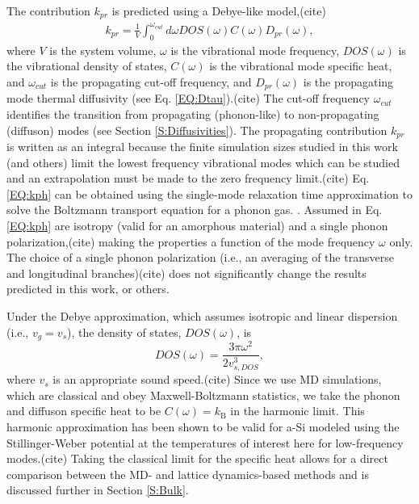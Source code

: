 \documentclass[aps,prb,twocolumn,superscriptaddress,footinbib,amsmath,amssymb,floatfix]{revtex4}
\begin{document}
The contribution $k_{pr}$ is predicted using a Debye-like model,(cite) 
\begin{equation}\label{EQ:kph}
\begin{split}
k_{pr} = \frac{1}{V}\int_{0}^{\omega_{cut}} 
d\omega DOS(\omega) C(\omega) D_{pr}(\omega),
\end{split}
\end{equation}
where $V$ is the system volume, $\omega$ is the vibrational mode 
frequency, $DOS(\omega)$ is the vibrational 
density of states, $C(\omega)$ is the vibrational mode specific heat, 
and $\omega_{cut}$ is the propagating cut-off frequency, and 
$D_{pr}(\omega)$ is the propagating mode thermal diffusivity 
(see Eq. \eqref{EQ:Dtau}).(cite) 
The cut-off frequency $\omega_{cut}$ identifies the transition from 
propagating (phonon-like) to non-propagating (diffuson) modes 
(see Section \ref{S:Diffusivities}).
\cite{feldman_thermal_1993,cahill_thermal_1994,
feldman_numerical_1999,liu_high_2009,yang_anomalously_2010}
The propagating contribution $k_{pr}$ is written as an integral because 
the finite simulation sizes studied in this work (and others)
\cite{feldman_thermal_1993,feldman_numerical_1999}
limit the lowest 
frequency vibrational modes which can be studied and an extrapolation 
must be made to the zero frequency limit.(cite)  
Eq. \eqref{EQ:kph} can be obtained using the single-mode relaxation
time approximation to solve 
the Boltzmann transport equation for a phonon gas.
\cite{ziman_electrons_2001}. Assumed in Eq. \eqref{EQ:kph} 
are isotropy (valid for an amorphous material) and a single phonon 
polarization,(cite) making the  
properties a function of the mode frequency $\omega$ only. The 
choice of a single phonon polarization (i.e., an averaging 
of the transverse and longitudinal branches)(cite) does not 
significantly change 
the results predicted in this work, or others.
\cite{feldman_thermal_1993,cahill_thermal_1994,
feldman_numerical_1999,baldi_thermal_2008,liu_high_2009,
yang_anomalously_2010} 

Under the Debye approximation, 
which assumes isotropic and linear dispersion (i.e., $v_g = v_s$), 
the density of states, $DOS(\omega)$, is
\begin{equation}\label{EQ:DOS_debye}
DOS(\omega) = \frac{3\pi\omega^2}{2v_{s,DOS}^3},
\end{equation}
where $v_s$ is an appropriate sound speed.(cite) 
Since we use MD simulations, which are classical 
and obey Maxwell-Boltzmann 
statistics,\cite{mcquarrie_statistical_2000} we take the phonon and diffuson 
specific heat to be $C(\omega) = k_{\text{B}}$ in the 
harmonic limit. This harmonic approximation has been shown to be valid 
for a-Si modeled using the Stillinger-Weber potential at the temperatures of 
interest here for low-frequency modes.(cite) 
Taking the classical limit for the specific heat allows for a direct 
comparison between 
the MD- and lattice dynamics-based methods and is discussed further in
Section \ref{S:Bulk}. 
\end{document}
